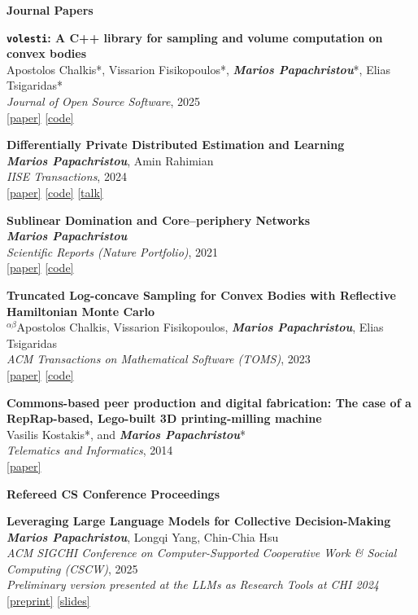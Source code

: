 \documentclass[margin]{res}
\newcommand{\field}[2]{\noindent \textbf{#1} \hfill #2 \\}
\newcommand{\alphabeticalorder}[0]{\ensuremath {^{\alpha \beta}}}
\newcommand{\specialurl}[2]{\href {#2} {{{[#1]}}}}
\newcommand{\preprint}[1]{\specialurl {preprint} {#1}}
\newcommand{\code}[1]{\specialurl {code} {#1}}
\newcommand{\talk}[1]{\specialurl {talk} {#1}}
\newcommand{\slides}[1]{\specialurl {slides} {#1}}
\newcommand{\paper}[1]{\specialurl {paper} {#1}}
\newcommand{\authorref}[1]{{\textit{\textbf{#1}}}}
\newcommand{\authorme}{\authorref{Marios Papachristou}}
\newcommand{\publication}[5]{\textbf{#1}\\{#2}\\\emph{#3}, {#4}\\{#5}\smallskip}
\begin{document}
\begin{resume}
\field{Journal Papers}{}{
\begin{enumerate}[nosep, label={[J\arabic*]}]
	\item \publication{\texttt{volesti}: A C++ library for sampling and volume computation on convex bodies}{Apostolos Chalkis*, Vissarion Fisikopoulos*, \authorme*, Elias Tsigaridas*}{Journal of Open Source Software}{2025}{\paper{https://joss.theoj.org/papers/10.21105/joss.07886} \code{https://github.com/GeomScale/volesti}}
   \item \publication{Differentially Private Distributed Estimation and Learning}{\authorme, Amin Rahimian}{IISE Transactions}{2024}{
   	   	\paper{https://doi.org/10.1080/24725854.2024.2337068} \code{https://github.com/papachristoumarios/dp-distributed-estimation} \talk{https://www.youtube.com/watch?v=Kmm5HEMuS4w}}
   \item \publication{Sublinear Domination and Core--periphery Networks}{\authorme}{Scientific Reports (Nature Portfolio)}{2021}{\paper{http://www.nature.com/articles/s41598-021-94105-8} \code{https://bit.ly/3wKNGI0}}
    \item \publication{Truncated Log-concave Sampling for Convex Bodies with Reflective Hamiltonian Monte Carlo}{\alphabeticalorder Apostolos Chalkis, Vissarion Fisikopoulos, \authorme, Elias Tsigaridas}{ACM Transactions on Mathematical Software (TOMS)}{2023}{\paper{https://doi.org/10.1145/3589505} \code{https://github.com/GeomScale/volume_approximation}}
    \item \publication{Commons-based peer production and digital fabrication: The case of a RepRap-based, Lego-built 3D printing-milling machine}{Vasilis Kostakis*, and \authorme*}{Telematics and Informatics}{2014}{\paper{https://bit.ly/2JRoisV}} 
    
\end{enumerate}}

\field{Refereed CS Conference Proceedings}{}{
\begin{enumerate}[nosep, label={[C\arabic*]}]


   \item \publication{Leveraging Large Language Models for Collective Decision-Making}{\authorme, Longqi Yang, Chin-Chia Hsu}{ACM SIGCHI Conference on Computer-Supported Cooperative Work \& Social Computing (CSCW)}{2025}{\emph{Preliminary version presented at the LLMs as Research Tools at CHI 2024} \\ \preprint{https://arxiv.org/abs/2311.04928} \slides{https://docs.google.com/presentation/d/13IsUt68rFoKdtq8wquL9fxVFHwH0hgvN/edit?usp=drive_link&ouid=109899272296285628946&rtpof=true&sd=true}}
 

\end{enumerate}}
\end{resume}
\end{document}
